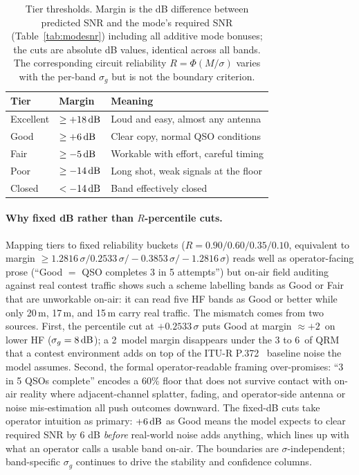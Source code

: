 \documentclass[11pt,a4paper]{article}
\newcommand{\SI}[2]{#1\,\text{#2}}
\newcommand{\si}[1]{\text{#1}}
\newcommand{\dB}{\text{dB}}
\begin{document}
\begin{table}[H]
\centering
\caption{Tier thresholds.  Margin is the dB difference between
predicted SNR and the mode's required SNR (Table~\ref{tab:modesnr})
including all additive mode bonuses; the cuts are absolute dB
values, identical across all bands.  The corresponding circuit
reliability $R = \Phi(M/\sigma)$ varies with the per-band
$\sigma_g$ but is not the boundary criterion.}
\label{tab:tiers}
\begin{tabular}{@{}lll@{}}
\toprule
\textbf{Tier} & \textbf{Margin} & \textbf{Meaning} \\
\midrule
Excellent & $\geq +18\,\si{\dB}$       & Loud and easy, almost any antenna \\
Good      & $\geq +6\,\si{\dB}$        & Clear copy, normal QSO conditions \\
Fair      & $\geq -5\,\si{\dB}$        & Workable with effort, careful timing \\
Poor      & $\geq -14\,\si{\dB}$       & Long shot, weak signals at the floor \\
Closed    & $< -14\,\si{\dB}$          & Band effectively closed \\
\bottomrule
\end{tabular}
\end{table}

\paragraph{Why fixed dB rather than $R$-percentile cuts.}
Mapping tiers to fixed
reliability buckets ($R = 0.90 / 0.60 / 0.35 / 0.10$, equivalent
to margin $\geq 1.2816\,\sigma / 0.2533\,\sigma / -0.3853\,\sigma /
-1.2816\,\sigma$) reads well as operator-facing prose
(``Good $=$ QSO completes 3 in 5 attempts'') but
on-air field auditing against real contest traffic shows such
a scheme labelling bands as Good
or Fair that are unworkable on-air: it can read
five HF bands as Good or better while only 20\,m, 17\,m, and
15\,m carry real traffic.  The mismatch comes from two
sources.  First, the percentile cut at $+0.2533\,\sigma$
puts Good at margin $\approx +2$\,\si{\dB} on lower HF
($\sigma_g = \SI{8}{\dB}$); a 2\,\si{\dB} model margin
disappears under the 3 to 6\,\si{\dB} of QRM that a contest
environment adds on top of the ITU-R P.372~\cite{itup372}
baseline noise the model assumes.  Second, the formal
operator-readable framing over-promises: ``3 in 5
QSOs complete'' encodes a $60\%$ floor that does not survive
contact with on-air reality where adjacent-channel splatter,
fading, and operator-side antenna or noise mis-estimation all
push outcomes downward.  The fixed-dB cuts take operator
intuition as primary: $+6\,\si{\dB}$ as Good means the model
expects to clear required SNR by 6 dB \emph{before} real-world
noise adds anything, which lines up with what an operator
calls a usable band on-air.  The boundaries are
$\sigma$-independent; band-specific $\sigma_g$ continues to
drive the stability and confidence columns.
\end{document}
